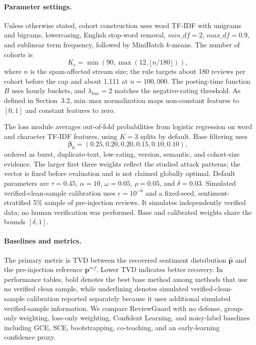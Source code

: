 \documentclass[runningheads]{llncs}
\begin{document}
\paragraph{Parameter settings.}
Unless otherwise stated, cohort construction uses word TF-IDF with unigrams and bigrams, lowercasing, English stop-word removal, \(min\_df=2\), \(max\_df=0.9\), and sublinear term frequency, followed by MiniBatch \(k\)-means. The number of cohorts is
\[
K_c=\min(90,\max(12,\lfloor n/180\rfloor)),
\]
where \(n\) is the spam-affected stream size; the rule targets about 180 reviews per cohort before the cap and about 1,111 at \(n=100{,}000\). The posting-time function \(B\) uses hourly buckets, and \(\lambda_{low}=2\) matches the negative-rating threshold. As defined in Section~3.2, min--max normalization maps non-constant features to \([0,1]\) and constant features to zero.

The loss module averages out-of-fold probabilities from logistic regression on word and character TF-IDF features, using \(K=3\) splits by default. Base filtering uses
\[
\boldsymbol{\beta}_0=(0.25,0.20,0.20,0.15,0.10,0.10),
\]
ordered as burst, duplicate-text, low-rating, version, semantic, and cohort-size evidence. The larger first three weights reflect the studied attack patterns; the vector is fixed before evaluation and is not claimed globally optimal. Default parameters are \(\tau=0.45\), \(\alpha=10\), \(\omega=0.05\), \(\rho=0.05\), and \(\delta=0.03\). Simulated verified-clean-sample calibration uses \(\epsilon=10^{-6}\) and a fixed-seed, sentiment-stratified 5\% sample of pre-injection reviews. It simulates independently verified data; no human verification was performed. Base and calibrated weights share the bounds \([\delta,1]\).

\paragraph{Baselines and metrics.}
The primary metric is TVD between the recovered sentiment distribution \(\hat{\mathbf{p}}\) and the pre-injection reference \(\mathbf{p}^{ref}\). Lower TVD indicates better recovery. In performance tables, bold denotes the best base method among methods that use no verified clean sample, while underlining denotes simulated verified-clean-sample calibration reported separately because it uses additional simulated verified-sample information. We compare ReviewGuard with no defense, group-only weighting, loss-only weighting, Confident Learning, and noisy-label baselines including GCE, SCE, bootstrapping, co-teaching, and an early-learning confidence proxy.
\end{document}
